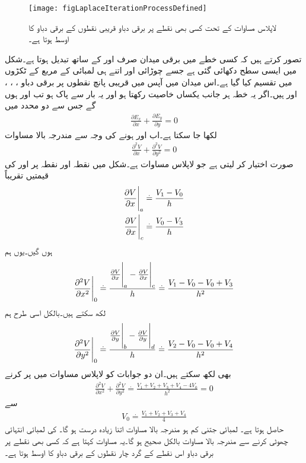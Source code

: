 \begin{figure}
\centering
\texttt{[image: figLaplaceIterationProcessDefined]}
\caption{لاپلاس مساوات کے تحت کسی بھی نقطے پر برقی دباو قریبی نقطوں کے برقی دباو کا اوسط ہوتا ہے۔}
\label{شکل_لاپلاس_برقی_دباو_اوسط_قیمت_ہی_ہے}
\end{figure}
تصور کرتے ہیں کہ کسی خطے میں برقی میدان صرف  اور  کے ساتھ تبدیل ہوتا ہے۔شکل  میں ایسی سطح دکھائی گئی ہے جسے  چوڑائی اور اتنے ہی لمبائی کے مربع کے ٹکڑوں میں تقسیم کیا گیا ہے۔اس میدان میں آپس میں قریبی پانچ نقطوں پر برقی دباو ، ، ،  اور   ہیں۔اگر یہ خطہ ہر جانب یکساں خاصیت رکھتا ہو اور یہ بار سے پاک ہو تب  اور  ہوں گے جس سے دو محدد میں
\begin{align*}
\frac{\partial E_x}{\partial x}+\frac{\partial E_y}{\partial y}=0
\end{align*}
لکھا جا سکتا ہے۔اب  اور  ہونے کی وجہ سے مندرجہ بالا مساوات 
\begin{align*}
\frac{\partial^2 V}{\partial x}+\frac{\partial^2 V}{\partial y^2}=0
\end{align*}
صورت اختیار کر لیتی ہے جو لاپلاس مساوات ہے۔شکل  میں نقطہ  اور نقطہ  پر  اور  کی قیمتیں تقریباً
\begin{align*}
\eval{\frac{\partial V}{\partial x}}_a&\overset{.}{=}\frac{V_1-V_0}{h}\\
\eval{\frac{\partial V}{\partial x}}_c&\overset{.}{=}\frac{V_0-V_3}{h}
\end{align*}
ہوں گیں۔یوں ہم
\begin{align*}
\eval{\frac{\partial^2 V}{\partial x^2}}_0\overset{.}{=}\frac{\eval{\frac{\partial V}{\partial x}}_a-\eval{\frac{\partial V}{\partial x}}_c}{h}
\overset{.}{=}\frac{V_1-V_0-V_0+V_3}{h^2}
\end{align*}
لکھ سکتے ہیں۔بالکل اسی طرح ہم
\begin{align*}
\eval{\frac{\partial^2 V}{\partial y^2}}_0\overset{.}{=}\frac{\eval{\frac{\partial V}{\partial y}}_b-\eval{\frac{\partial V}{\partial y}}_d}{h}
\overset{.}{=}\frac{V_2-V_0-V_0+V_4}{h^2}
\end{align*}
بھی لکھ سکتے ہیں۔ان دو جوابات کو لاپلاس مساوات میں پر کرنے
\begin{align*}
\frac{\partial^2 V}{\partial x^2}+\frac{\partial^2 V}{\partial y^2}\overset{.}{=}\frac{V_1+V_2+V_3+V_4-4V_0}{h^2}=0
\end{align*}
سے
\begin{align}\label{مساوات_لاپلاس_عددی_دہرانے_کا_طریقہ}
V_0\overset{.}{=}\frac{V_1+V_2+V_3+V_4}{4}
\end{align}
حاصل ہوتا ہے۔ لمبائی جتنی کم ہو مندرجہ بالا مساوات اتنا زیادہ درست ہو گا۔ کی لمبائی انتہائی چھوٹی کرنے سے مندرجہ بالا مساوات بالکل صحیح ہو گا۔یہ مساوات  کہتا ہے کہ کسی بھی نقطے پر برقی دباو اس نقطے کے گرد چار نقطوں کے برقی دباو کا اوسط ہوتا ہے۔

